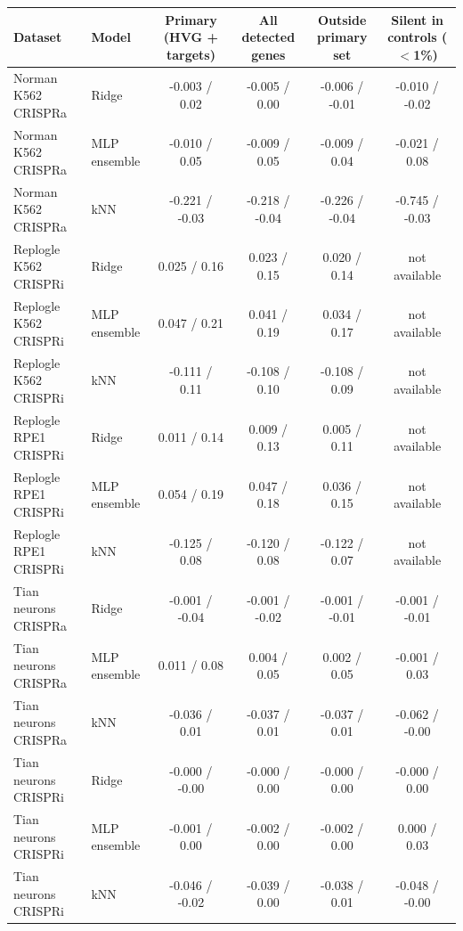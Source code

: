 \begin{tabular}{llcccc}
\toprule
Dataset & Model & Primary (HVG + targets) & All detected genes & Outside primary set & Silent in controls ($<$1\%) \\
\midrule
Norman K562 CRISPRa & Ridge & -0.003 / 0.02 & -0.005 / 0.00 & -0.006 / -0.01 & -0.010 / -0.02 \\
Norman K562 CRISPRa & MLP ensemble & -0.010 / 0.05 & -0.009 / 0.05 & -0.009 / 0.04 & -0.021 / 0.08 \\
Norman K562 CRISPRa & kNN & -0.221 / -0.03 & -0.218 / -0.04 & -0.226 / -0.04 & -0.745 / -0.03 \\
Replogle K562 CRISPRi & Ridge & 0.025 / 0.16 & 0.023 / 0.15 & 0.020 / 0.14 & not available \\
Replogle K562 CRISPRi & MLP ensemble & 0.047 / 0.21 & 0.041 / 0.19 & 0.034 / 0.17 & not available \\
Replogle K562 CRISPRi & kNN & -0.111 / 0.11 & -0.108 / 0.10 & -0.108 / 0.09 & not available \\
Replogle RPE1 CRISPRi & Ridge & 0.011 / 0.14 & 0.009 / 0.13 & 0.005 / 0.11 & not available \\
Replogle RPE1 CRISPRi & MLP ensemble & 0.054 / 0.19 & 0.047 / 0.18 & 0.036 / 0.15 & not available \\
Replogle RPE1 CRISPRi & kNN & -0.125 / 0.08 & -0.120 / 0.08 & -0.122 / 0.07 & not available \\
Tian neurons CRISPRa & Ridge & -0.001 / -0.04 & -0.001 / -0.02 & -0.001 / -0.01 & -0.001 / -0.01 \\
Tian neurons CRISPRa & MLP ensemble & 0.011 / 0.08 & 0.004 / 0.05 & 0.002 / 0.05 & -0.001 / 0.03 \\
Tian neurons CRISPRa & kNN & -0.036 / 0.01 & -0.037 / 0.01 & -0.037 / 0.01 & -0.062 / -0.00 \\
Tian neurons CRISPRi & Ridge & -0.000 / -0.00 & -0.000 / 0.00 & -0.000 / 0.00 & -0.000 / 0.00 \\
Tian neurons CRISPRi & MLP ensemble & -0.001 / 0.00 & -0.002 / 0.00 & -0.002 / 0.00 & 0.000 / 0.03 \\
Tian neurons CRISPRi & kNN & -0.046 / -0.02 & -0.039 / 0.00 & -0.038 / 0.01 & -0.048 / -0.00 \\
\bottomrule
\end{tabular}
